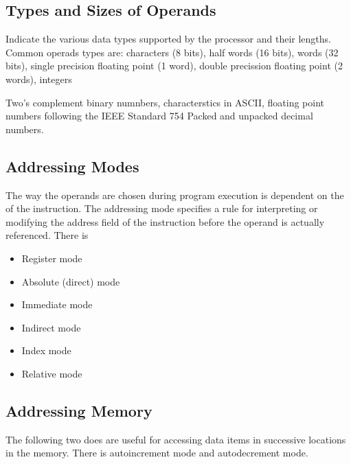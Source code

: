 \documentclass[12pt]{scrartcl}
\begin{document}
\subsection{Types and Sizes of Operands}

\begin{definition}
  Indicate the various data types supported by the processor and their lengths. 
  Common operads types are: characters (8 bits), half words (16 bits), words (32 bits), single precision floating point (1 word), 
  double precission floating point (2 words), integers

  Two's complement binary numnbers, characterstics in ASCII, floating point numbers following the IEEE 
  Standard 754 Packed and unpacked decimal numbers. 
\end{definition}

\subsection{Addressing Modes}

\begin{definition}
  The way the operands are chosen during program execution is dependent on the 
   of the instruction. The addressing mode specifies a rule for 
  interpreting or modifying the address field of the instruction before the operand is actually referenced. 
  There is 
  \begin{itemize}
    \item Register mode
    \item Absolute (direct) mode
    \item Immediate mode
    \item Indirect mode
    \item Index mode
    \item Relative mode
  \end{itemize}
\end{definition}

\subsection{Addressing Memory}

\begin{definition}
  The following two does are useful for accessing data items in successive locations in the memory. 
  There is autoincrement mode and autodecrement mode.  
\end{definition}
\end{document}
